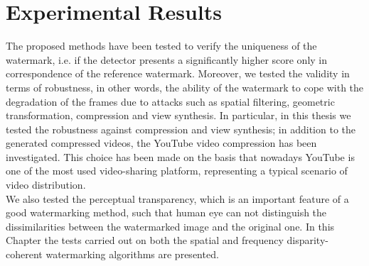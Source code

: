 \chapter{Experimental Results}
\label{exp}

The proposed methods have been tested to verify the uniqueness of the watermark, i.e. if the detector presents a significantly higher score only in correspondence of the reference watermark. Moreover, we tested the validity in terms of robustness, in other words, the ability of the watermark to cope with the degradation of the frames due to attacks such as spatial filtering, geometric transformation, compression and view synthesis. \newline 
In particular, in this thesis we tested the robustness against compression and view synthesis; in addition to the generated compressed videos, the YouTube video compression has been investigated. This choice has been made on the basis that nowadays YouTube is one of the most used video-sharing platform, representing a typical scenario of video distribution.\\
We also tested the perceptual transparency, which is an important feature of a good watermarking method, such that human eye can not distinguish the dissimilarities between the watermarked image and the original one.\newline
In this Chapter the tests carried out on both the spatial and frequency disparity-coherent watermarking algorithms are presented. \newline

